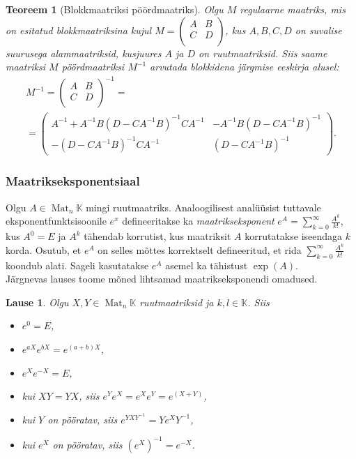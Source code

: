 \documentclass[a4paper,12pt]{article}
\theoremstyle{plain}
\newtheorem{teoreem}{Teoreem}[section]
\newtheorem{lause}{Lause}[section]
\theoremstyle{definition}
\numberwithin{equation}{section}
\def\K{{\mathbb K}}
\DeclareMathOperator{\Mat}{Mat}
\begin{document}
\begin{teoreem}[Blokkmaatriksi pöördmaatriks]
Olgu $M$ regulaarne maatriks, mis on esitatud blokkmaatriksina kujul $M = \begin{pmatrix} A & B \\ C & D \\ \end{pmatrix}$, kus $A, B, C, D$ on suvalise suurusega alammaatriksid, kusjuures $A$ ja $D$ on ruutmaatriksid. Siis saame maatriksi $M$ pöördmaatriksi $M^{-1}$ arvutada blokkidena järgmise eeskirja alusel:
\begin{align*}
M^{-1} = \begin{pmatrix}
A & B \\ C & D \\
\end{pmatrix}^{-1} = \qquad\qquad\qquad\qquad\qquad \\
= \begin{pmatrix}
A^{-1}+A^{-1}B\left(D-CA^{-1}B\right)^{-1}CA^{-1} & -A^{-1}B\left(D-CA^{-1}B\right)^{-1} \\
-\left(D- CA^{-1}B\right)^{-1}CA^{-1} & \left(D-CA^{-1}B\right)^{-1}
\end{pmatrix}.
\end{align*}
\end{teoreem}

\subsubsection{Maatrikseksponentsiaal}

Olgu $A \in \Mat_n\K$ mingi ruutmaatriks. Analoogilisest analüüsist tuttavale eksponentfunktsisoonile $e^x$ defineeritakse ka \emph{maatrikseksponent} $e^A = \sum_{k = 0}^{\infty} \frac{A^k}{k!}$, kus $A^0 = E$ ja $A^k$ tähendab korrutist, kus maatriksit $A$ korrutatakse iseendaga $k$ korda. Osutub, et $e^A$ on selles mõttes korrektselt defineeritud, et rida $\sum_{k = 0}^{\infty} \frac{A^k}{k!}$ koondub alati. Sageli kasutatakse $e^A$ asemel ka tähistust $\exp\left(A\right)$.\\
Järgnevas lauses toome mõned lihtsamad maatrikseksponendi omadused.
\begin{lause}
Olgu $X, Y \in \Mat_n \K$ ruutmaatriksid ja $k, l \in \K$. Siis
\begin{itemize}
\item $e^0 = E$,
\item $e^{aX}e^{bX} = e^{\left(a+b\right)X}$,
\item $e^{X} e^{-X} = E$,
\item kui $XY = YX$, siis $e^Y e^X = e^X e^Y = e^{\left(X + Y\right)}$,
\item kui $Y$ on pööratav, siis $e^{YXY^{-1}} = Ye^XY^{-1}$,
\item kui $e^X$ on pööratav, siis $\left(e^X\right)^{-1} = e^{-X}$.
\end{itemize}
\end{lause}
\end{document}
